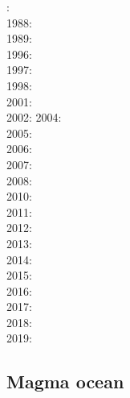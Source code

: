 {\scriptsize
{}: \cite{dagu86}\\
1988: \cite{hayu88}\\
1989: \cite{hayu89}\\
1996: \cite{boeh96}\\
1997: \cite{kell97}\\
1998: \cite{tack98b}\\
2001: \cite{soga01}\\
2002: \cite{somo02}\cite{tagh02}
2004: \cite{mczh04}\cite{nata04}\\
2005: \cite{mczh05a}\cite{nata05}\cite{nata05b}\\
2006: \cite{nata06}\\
2007: \cite{heta07}\cite{moyu07}\cite{pelt07}\cite{hibl07}\cite{yumc07}\\
2008: \cite{gamc08}\cite{nata08}\cite{stho08}\\
2010: \cite{stto10}\cite{mcgr10}\cite{nata10}\cite{vady10}\\
2011: \cite{bowg11}\cite{talz11}\cite{vayj11}\\
2012: \cite{stto12}\cite{dagd12}\cite{dect12}\\
2013: \cite{limc13}\cite{bogs13a}\cite{bogs13b}\\
2014: \cite{budt14}\cite{lidt14}\cite{tovd14}\\
2015: \cite{musd15}\cite{hafg15}\cite{delt15}\cite{wilm15}\cite{lidt15}\\
2016: \cite{dost16}\cite{tosa16}\\
2017: \cite{hish17}\cite{lizh17}\\
2018: \cite{daga18}\cite{lizo18}\cite{hect18}\cite{dert18}\\
2019: \cite{hebo19}\cite{rejv19}
}

\subsection{Magma ocean}

{\scriptsize
\noindent
\cite{elvh02}
\cite{hosh06}
\cite{devv10}
\cite{ullc12}
\cite{plth13}\cite{moha13}
\cite{maha15}
}

